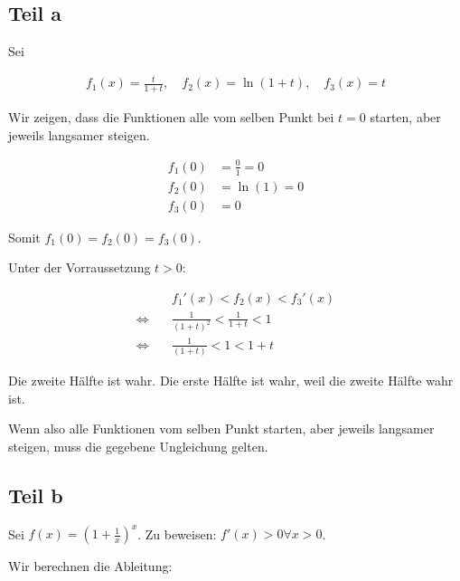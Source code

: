 \documentclass[a4paper,german,12pt,smallheadings]{scrartcl}
\begin{document}
\subsection*{Teil a}
Sei

\begin{align*}
  f_1(x) = \frac{t}{1+t}, \quad f_2(x) = \ln(1+t), \quad f_3(x) = t
\end{align*}

Wir zeigen, dass die Funktionen alle vom selben Punkt bei $t=0$ starten, aber
jeweils langsamer steigen.

\begin{align*}
  f_1(0) &= \frac{0}{1} = 0 \\
  f_2(0) &= \ln(1) = 0 \\
  f_3(0) &= 0
\end{align*}

Somit $f_1(0) = f_2(0) = f_3(0)$.

Unter der Vorraussetzung $t>0$:

\begin{align*}
&f_1'(x) < f_2(x) < f_3'(x) \\
\Leftrightarrow\quad&\frac{1}{(1+t)^2} < \frac{1}{1+t} < 1 \\
\Leftrightarrow\quad&\frac{1}{(1+t)} < 1 < 1+t
\end{align*}

Die zweite Hälfte ist wahr. Die erste Hälfte ist wahr, weil die zweite Hälfte
wahr ist.

Wenn also alle Funktionen vom selben Punkt starten, aber jeweils langsamer
steigen, muss die gegebene Ungleichung gelten.

\subsection*{Teil b}

Sei $f(x) = \left(1+\frac{1}{x}\right)^x$. Zu beweisen: $f'(x) > 0 \forall x > 0$.

Wir berechnen die Ableitung:
\end{document}
